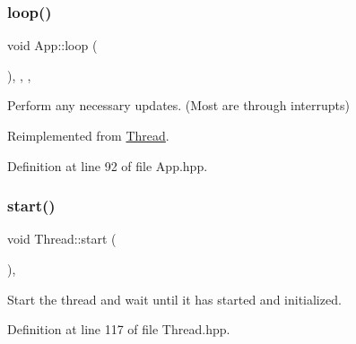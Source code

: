 \subsubsection{\texorpdfstring{loop()}{loop()}}
{\footnotesize\ttfamily void App\+::loop (\begin{DoxyParamCaption}{ }\end{DoxyParamCaption})\hspace{0.3cm}{\ttfamily [inline]}, {\ttfamily [override]}, {\ttfamily [protected]}, {\ttfamily [virtual]}}

Perform any necessary updates. (Most are through interrupts) 

Reimplemented from \mbox{\hyperlink{classThread_ab1a2613851db5be41e35aaf3d7dd6ab1}{Thread}}.



Definition at line 92 of file App.\+hpp.


\begin{DoxyCode}{0}

\end{DoxyCode}
\mbox{\label{classThread_a1f53ee62bd30a7924186ef26150ce262}} 
\subsubsection{\texorpdfstring{start()}{start()}}
{\footnotesize\ttfamily void Thread\+::start (\begin{DoxyParamCaption}{ }\end{DoxyParamCaption})\hspace{0.3cm}{\ttfamily [inline]}, {\ttfamily [inherited]}}

Start the thread and wait until it has started and initialized. 

Definition at line 117 of file Thread.\+hpp.


